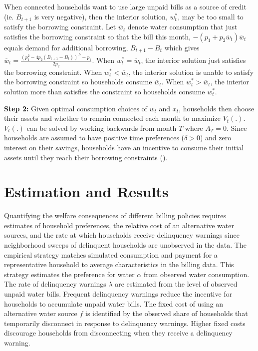 \documentclass[12pt]{article}
\begin{document}
When connected households want to use large unpaid bills as a source of credit (ie. $B_{t+1}$ is very negative), then the  interior solution, $w_t^{*}$, may be too small to satisfy the borrowing constraint.  Let $\overline{w}_t$ denote water consumption that just satisfies the borrowing constraint so that the bill this month, $-(p_1 +p_2\overline{w}_t)\overline{w}_t$ equals demand for additional borrowing, $B_{t+1}-B_{t}$ which gives $\overline{w}_t = \frac{(p_1^2 - 4p_2 (B_{t+1}-B_{t}))^{.5} - p_1}{2 p_2}$.  When $w_t^{*}=\overline{w}_t$, the interior solution just satisfies the borrowing constraint.  When $w_t^{*}<\overline{w}_t$, the interior solution is unable to satisfy the borrowing constraint so households consume $\overline{w}_t$.  When $w_t^{*}>\overline{w}_t$, the  interior solution more than satisfies the constraint so households consume $w_t^{*}$.

\textbf{Step 2:}  Given optimal consumption choices of $w_t$ and $x_t$, households then choose their assets and whether to remain connected each month to maximize $V_t(.)$.  $V_t(.)$ can be solved by working backwards from month $T$ where $A_T = 0$.  Since households are assumed to have positive time preferences ($\delta>0$) and zero interest on their savings, households have an incentive to consume their initial assets until they reach their borrowing constraints (\cite{deaton1991saving}).  






\section{Estimation and Results}\label{section:estimation}    %



Quantifying the welfare consequences of different billing policies requires estimates of household preferences, the relative cost of an alternative water sources, and the rate at which households receive delinquency warnings since neighborhood sweeps of delinquent households are unobserved in the data.  The empirical strategy matches simulated consumption and payment for a representative household to average characteristics in the billing data.  This strategy estimates the preference for water $\alpha$ from observed water consumption.  The rate of delinquency warnings $\lambda$ are estimated from the level of observed unpaid water bills.  Frequent delinquency warnings reduce the incentive for households to accumulate unpaid water bills.  The fixed cost of using an alternative water source $f$ is identified by the observed share of households that temporarily disconnect in response to delinquency warnings.  Higher fixed costs discourage households from disconnecting when they receive a delinquency warning.
\end{document}
